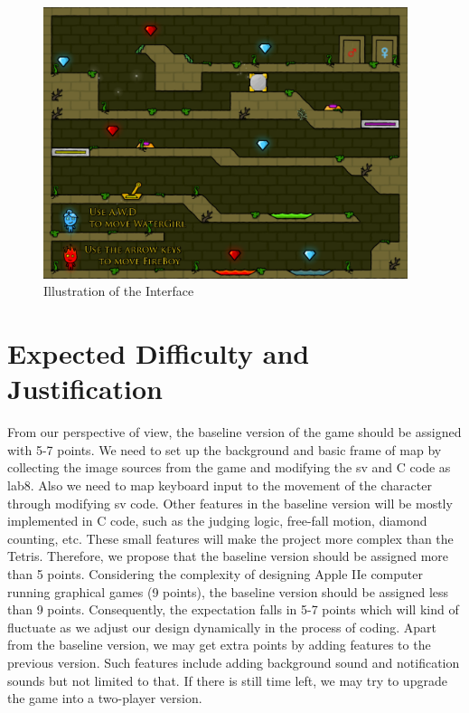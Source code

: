 \documentclass[a4paper]{article}
\begin{document}
\begin{figure}[ht]
    \centering
    \includegraphics[width = 0.95\textwidth]{images/1.png}
    \caption{Illustration of the Interface}
\end{figure}

\section{Expected Difficulty and Justification}
From our perspective of view, the baseline version of the game should be assigned with 5-7 points. We need to set up the background and basic frame of map by collecting the image sources from the game and modifying the sv and C code as lab8. 
Also we need to map keyboard input to the movement of the character through modifying sv code. Other features in the baseline version will be mostly implemented in C code, such as the judging logic, free-fall motion, diamond counting, etc. 
These small features will make the project more complex than the Tetris. Therefore, we propose that the baseline version should be assigned more than 5 points. Considering the complexity of designing Apple IIe computer running graphical games (9 points), 
the baseline version should be assigned less than 9 points. Consequently, the expectation falls in 5-7 points which will kind of fluctuate as we adjust our design dynamically in the process of coding. Apart from the baseline version, we may get extra 
points by adding features to the previous version. Such features include adding background sound and notification sounds but not limited to that. If there is still time left, we may try to upgrade the game into a two-player version. 
\end{document}
